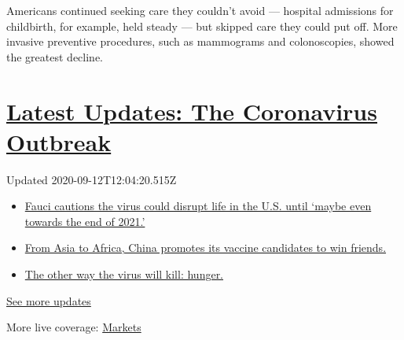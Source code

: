 Americans continued seeking care they couldn't avoid --- hospital
admissions for childbirth, for example, held steady --- but skipped care
they could put off. More invasive preventive procedures, such as
mammograms and colonoscopies, showed the greatest decline.

\hypertarget{latest-updates-the-coronavirus-outbreak}{%
\section{\texorpdfstring{\href{https://www.nytimes3xbfgragh.onion/2020/09/11/world/covid-19-coronavirus.html?action=click\&pgtype=Article\&state=default\&region=MAIN_CONTENT_1\&context=storylines_live_updates}{Latest
Updates: The Coronavirus
Outbreak}}{Latest Updates: The Coronavirus Outbreak}}\label{latest-updates-the-coronavirus-outbreak}}

Updated 2020-09-12T12:04:20.515Z

\begin{itemize}
\tightlist
\item
  \href{https://www.nytimes3xbfgragh.onion/2020/09/11/world/covid-19-coronavirus.html?action=click\&pgtype=Article\&state=default\&region=MAIN_CONTENT_1\&context=storylines_live_updates\#link-dfb8a16}{Fauci
  cautions the virus could disrupt life in the U.S. until `maybe even
  towards the end of 2021.'}
\item
  \href{https://www.nytimes3xbfgragh.onion/2020/09/11/world/covid-19-coronavirus.html?action=click\&pgtype=Article\&state=default\&region=MAIN_CONTENT_1\&context=storylines_live_updates\#link-7104d154}{From
  Asia to Africa, China promotes its vaccine candidates to win friends.}
\item
  \href{https://www.nytimes3xbfgragh.onion/2020/09/11/world/covid-19-coronavirus.html?action=click\&pgtype=Article\&state=default\&region=MAIN_CONTENT_1\&context=storylines_live_updates\#link-393ad215}{The
  other way the virus will kill: hunger.}
\end{itemize}

\href{https://www.nytimes3xbfgragh.onion/2020/09/11/world/covid-19-coronavirus.html?action=click\&pgtype=Article\&state=default\&region=MAIN_CONTENT_1\&context=storylines_live_updates}{See
more updates}

More live coverage:
\href{https://www.nytimes3xbfgragh.onion/live/2020/09/11/business/stock-market-today-coronavirus?action=click\&pgtype=Article\&state=default\&region=MAIN_CONTENT_1\&context=storylines_live_updates}{Markets}

